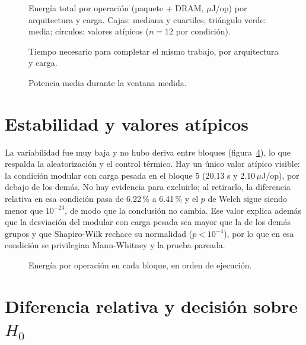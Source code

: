 \begin{figure}[H]
\centering
{}
\caption{Energía total por operación (paquete + DRAM, $\mu$J/op) por arquitectura y carga. Cajas: mediana y cuartiles; triángulo verde: media; círculos: valores atípicos ($n = 12$ por condición).}
\label{fig:energia-op}
\end{figure}

\begin{figure}[H]
\centering
{}
\caption{Tiempo necesario para completar el mismo trabajo, por arquitectura y carga.}
\label{fig:tiempo}
\end{figure}

\begin{figure}[H]
\centering
{}
\caption{Potencia media durante la ventana medida.}
\label{fig:potencia}
\end{figure}

\section{Estabilidad y valores atípicos}

La variabilidad fue muy baja y no hubo deriva entre bloques (figura~\ref{fig:bloques}), lo que respalda la aleatorización y el control térmico. Hay un único valor atípico visible: la condición modular con carga pesada en el bloque 5 (20.13 s y 2.10\,$\mu$J/op), por debajo de los demás. No hay evidencia para excluirlo; al retirarlo, la diferencia relativa en esa condición pasa de 6.22\,\% a 6.41\,\% y el $p$ de Welch sigue siendo menor que $10^{-23}$, de modo que la conclusión no cambia. Ese valor explica además que la desviación del modular con carga pesada sea mayor que la de los demás grupos y que Shapiro-Wilk rechace su normalidad ($p < 10^{-4}$), por lo que en esa condición se privilegian Mann-Whitney y la prueba pareada.

\begin{figure}[H]
\centering
{}
\caption{Energía por operación en cada bloque, en orden de ejecución.}
\label{fig:bloques}
\end{figure}

\section{Diferencia relativa y decisión sobre \texorpdfstring{$H_0$}{H0}}

